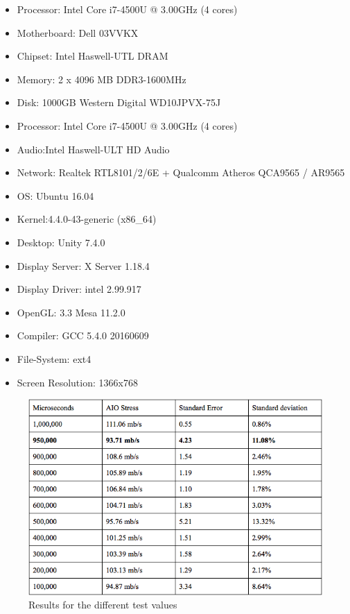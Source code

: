 \documentclass[a4paper]{article}
\begin{document}
\begin{itemize}

\item Processor: Intel Core i7-4500U @ 3.00GHz (4 cores)
\item Motherboard: Dell 03VVKX
\item Chipset: Intel Haswell-UTL DRAM
\item Memory: 2 x 4096 MB DDR3-1600MHz
\item Disk: 1000GB Western Digital WD10JPVX-75J
\item Processor: Intel Core i7-4500U @ 3.00GHz (4 cores)
\item Audio:Intel Haswell-ULT HD Audio
\item Network: Realtek RTL8101/2/6E + Qualcomm Atheros QCA9565 / AR9565
\item OS: Ubuntu 16.04
\item Kernel:4.4.0-43-generic (x86\_64)
\item Desktop: Unity 7.4.0
\item Display Server: X Server 1.18.4
\item Display Driver: intel 2.99.917
\item OpenGL: 3.3 Mesa 11.2.0
\item Compiler: GCC 5.4.0 20160609
\item File-System: ext4
\item Screen Resolution: 1366x768

\end{itemize}

\begin{figure}
\includegraphics[width=1.0\textwidth]{Resultados.png}
\caption{\label{fig:Resultados} Results for the different test values}
\end{figure}
\end{document}
